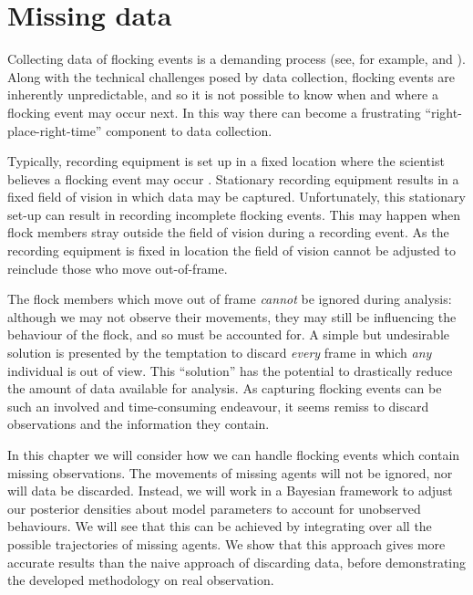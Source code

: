 \graphicspath{{fig/missing/}%
              {fig/scoters/}}

\chapter{Missing data}
\label{cha:missing}

Collecting data of flocking events is a demanding process (see, for example,
\textcite{cavagna08a} and \textcite{lukeman10}). Along with the technical
challenges posed by data collection, flocking events are inherently
unpredictable, and so it is not possible to know when and where a flocking
event may occur next. In this way there can become a frustrating
``right-place-right-time'' component to data collection.

Typically, recording equipment is set up in a fixed location where the
scientist believes a flocking event may occur \parencite{lukeman10}. Stationary
recording equipment results in a fixed field of vision in which data may be
captured. Unfortunately, this stationary set-up can result in recording
incomplete flocking events. This may happen when flock members stray outside
the field of vision during a recording event. As the recording equipment is
fixed in location the field of vision cannot be adjusted to reinclude those who
move out-of-frame.

The flock members which move out of frame \emph{cannot} be ignored during
analysis: although we may not observe their movements, they may still be
influencing the behaviour of the flock, and so must be accounted for. A simple
but undesirable solution is presented by the temptation to discard \emph{every}
frame in which \emph{any} individual is out of view. This ``solution'' has the
potential to drastically reduce the amount of data available for analysis. As
capturing flocking events can be such an involved and time-consuming endeavour,
it seems remiss to discard observations and the information they contain.

In this chapter we will consider how we can handle flocking events which
contain missing observations. The movements of missing agents will not be
ignored, nor will data be discarded. Instead, we will work in a Bayesian framework
to adjust our posterior densities about model parameters to account for
unobserved behaviours. We will see that this can be achieved by integrating
over all the possible trajectories of missing agents. We show that
this approach gives more accurate results than the naive approach of discarding
data, before demonstrating the developed methodology on real observation.

